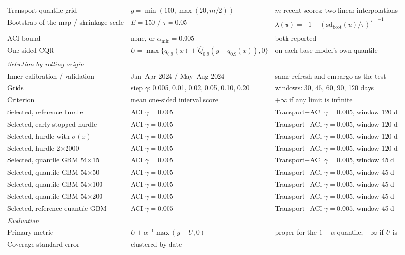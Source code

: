 \begin{longtable}{p{} p{} p{}}
Transport quantile grid & $g=\min(100,\max(20,m/2))$ & $m$ recent scores; two linear interpolations \\
Bootstrap of the map / shrinkage scale & $B=150$ / $\tau=0.05$ & $\lambda(u)=[1+(\mathrm{sd}_{\mathrm{boot}}(u)/\tau)^2]^{-1}$ \\
ACI bound & none, or $\alpha_{\min}=0.005$ & both reported \\
One-sided CQR & $U=\max\{q_{0.9}(x)+\hat Q_{0.9}(y-q_{0.9}(x)),0\}$ & on each base model's own quantile \\
\textit{Selection by rolling origin} &  &  \\
Inner calibration / validation & Jan--Apr 2024 / May--Aug 2024 & same refresh and embargo as the test \\
Grids & step $\gamma$: 0.005, 0.01, 0.02, 0.05, 0.10, 0.20 & windows: 30, 45, 60, 90, 120 days \\
Criterion & mean one-sided interval score & $+\infty$ if any limit is infinite \\
Selected, reference hurdle & ACI $\gamma=0.005$ & Transport+ACI $\gamma=0.005$, window 120 d \\
Selected, early-stopped hurdle & ACI $\gamma=0.005$ & Transport+ACI $\gamma=0.005$, window 120 d \\
Selected, hurdle with $\sigma(x)$ & ACI $\gamma=0.005$ & Transport+ACI $\gamma=0.005$, window 120 d \\
Selected, hurdle 2$\times$2000 & ACI $\gamma=0.005$ & Transport+ACI $\gamma=0.005$, window 120 d \\
Selected, quantile GBM 54$\times$15 & ACI $\gamma=0.005$ & Transport+ACI $\gamma=0.005$, window 45 d \\
Selected, quantile GBM 54$\times$50 & ACI $\gamma=0.005$ & Transport+ACI $\gamma=0.005$, window 45 d \\
Selected, quantile GBM 54$\times$100 & ACI $\gamma=0.005$ & Transport+ACI $\gamma=0.005$, window 45 d \\
Selected, quantile GBM 54$\times$200 & ACI $\gamma=0.005$ & Transport+ACI $\gamma=0.005$, window 45 d \\
Selected, reference quantile GBM & ACI $\gamma=0.005$ & Transport+ACI $\gamma=0.005$, window 45 d \\
\textit{Evaluation} &  &  \\
Primary metric & $U+\alpha^{-1}\max(y-U,0)$ & proper for the $1-\alpha$ quantile; $+\infty$ if $U$ is \\
Coverage standard error & clustered by date &  \\

\end{longtable}
